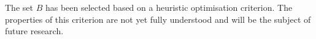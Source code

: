 \documentclass[10pt,twocolumn,twoside]{IEEEtran}
\begin{document}
The set $B$ has been selected based on a heuristic optimisation criterion.  The properties of this criterion are not yet fully understood and will be the subject of future research.


\end{document}
